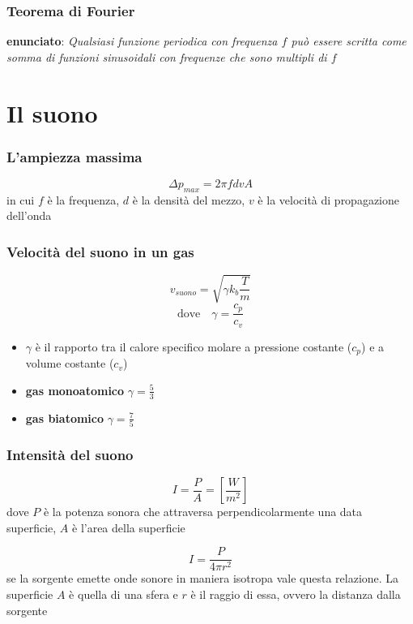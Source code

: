 \documentclass{article}
\begin{document}
\subsubsection*{Teorema di Fourier}
\textbf{enunciato}: \textit{Qualsiasi funzione periodica con frequenza $f$ può essere scritta come somma di funzioni sinusoidali con frequenze che sono multipli di $f$}

\section*{Il suono}
\subsubsection*{L'ampiezza massima}
$$ \Delta p_{max} = 2\pi fdvA $$
in cui $f$ è la frequenza, $d$ è la densità del mezzo, $v$ è la velocità di propagazione dell'onda

\subsubsection*{Velocità del suono in un gas}
$$ v_{suono} = \sqrt{\gamma k_b \frac{T}{m}} $$
$$ \text{dove} \hspace{1em} \gamma = \frac{c_p}{c_v} $$
\begin{itemize}
    \item $\gamma$ è il rapporto tra il calore specifico molare a pressione costante ($c_p$) e a volume costante ($c_v$)
    \item \textbf{gas monoatomico} \textrightarrow \hspace{1em} $\gamma = \frac{5}{3}$
    \item \textbf{gas biatomico} \textrightarrow \hspace{1em} $\gamma = \frac{7}{5}$
\end{itemize}

\subsubsection*{Intensità del suono}
$$ I = \frac{P}{A} = \left[\frac{W}{m^2}\right] $$
dove $P$ è la potenza sonora che attraversa perpendicolarmente una data superficie, $A$ è l'area della superficie

\vspace{1em}

$$ I = \frac{P}{4\pi r^2} $$
se la sorgente emette onde sonore in maniera isotropa vale questa relazione. La superficie $A$ è quella di una sfera e $r$ è il raggio di essa, ovvero la distanza dalla sorgente
\end{document}
